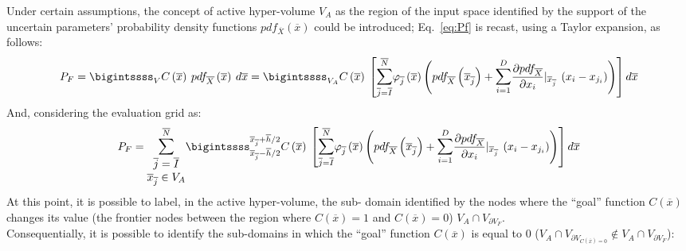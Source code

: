 Under certain assumptions, the concept of active hyper-volume 
$V_{A}$ as the region of the input space identified by the support of 
the uncertain parameters’ probability density functions 
$pdf_{\overline{X}}\left ( \overline{x} \right )$ could be introduced; 
Eq.~\ref{eq:Pf} is recast, using a Taylor expansion, as follows: 
 \begin{equation} 
P_{F}= \bigintssss_{V} C\left ( \overline{x} \right )\: pdf_{\overline{X}}\left ( 
\overline{x}  \right )\: d\overline{x} =\bigintssss_{V_{A}}C\left ( \overline{x} 
\right )\: 
\left [  
\mathlarger{\sum}_{\overline{j}=\overline{I}}^{\overline{N}}\varphi_{\overline{j}}\left ( 
\overline{x} \right )
\left ( pdf_{\overline{X}}\left ( \overline{x}_{\overline{j}} \right ) +
\mathlarger{\sum}_{i=1}^{D} \frac{\partial pdf_{\overline{X}}}{\partial x_{i}}|
_{\overline{x}_{\overline{j}}} \: \left ( x_{i} - x_{j_{i}} \right ) \right ) \right 
] d\overline{x}
 \end{equation}
And, considering the evaluation grid as:
\begin{equation}
\label{eq:PfEq}
P_{F}= \mathlarger{\sum}_{\begin{matrix}
\overline{j}=\overline{I} \\ \overline{x}_{\overline{j}} \in V_{A} \end{matrix}}^{\overline{N}} 
\bigintssss_{\overline{x}_{\overline{j}} - \overline{h}/2}^{\overline{x}_{\overline{j}} + \overline{h}/2} C\left ( \overline{x} \right )\: 
\left [  \mathlarger{\sum}_{\overline{j}=\overline{I}}^{\overline{N}}\varphi_{\overline{j}}\left ( \overline{x} \right )
\left ( pdf_{\overline{X}}\left ( \overline{x}_{\overline{j}} \right ) +
\mathlarger{\sum}_{i=1}^{D} \frac{\partial pdf_{\overline{X}}}{\partial x_{i}}|_{\overline{x}_{\overline{j}}} \: \left ( x_{i} - x_{j_{i}} \right ) \right ) \right ] d\overline{x}
\end{equation}
At this point, it is possible to label, in the active hyper-volume, the sub-
domain identified by the nodes where the ``goal'' function  
$C(\overline{x})$ changes its value (the frontier nodes between the 
region where $C(\overline{x})=1$ and $C(\overline{x})=0$) $V_{A} \cap 
V_{\partial V_{F}}$.
\\ Consequentially, it is possible to identify the sub-domains in which the  ``goal''  function $C(\overline{x})$ is equal to $0$ ($V_{A} \cap V_{\partial V_{C(\overline{x})=0}} \notin V_{A} \cap V_{\partial V_{F}}$):


